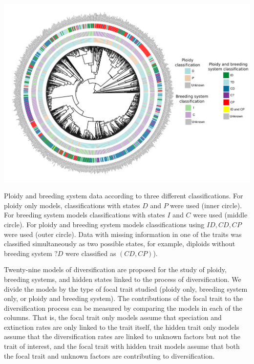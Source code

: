 \begin{suppfigure}
\includegraphics[width=\textwidth]{figS1.pdf}
    \caption{Ploidy and breeding system data according to three different classifications. For ploidy only models, classifications with states $D$ and $P$ were used (inner circle). For breeding system models classifications with states $I$ and $C$ were used (middle circle). For ploidy and breeding system models classifications using $ID, CD, CP$ were used (outer circle). Data with missing information in one of the traits was classified simultaneously as two possible states, for example, diploids without breeding system $?D$ were classified as $(CD, CP)$).}
    \label{fig:allmodels}
\end{suppfigure}



\begin{suppfigure}%
    \caption{ Twenty-nine models of diversification are proposed for the study of ploidy, breeding systems, and hidden states linked to the process of diversification. We divide the models by the type of focal trait studied (ploidy only, breeding system only, or ploidy and breeding system). The contributions of the focal trait to the diversification process can be measured by comparing the models in each of the columns. That is, the focal trait only models assume that speciation and extinction rates are only linked to the trait itself, the hidden trait only models assume that the diversification rates are  linked to unknown factors but not the trait of interest, and the focal trait with hidden trait models assume that both the focal trait and unknown factors are contributing to diversification.}
    \label{fig:allmodels}
\end{suppfigure}



